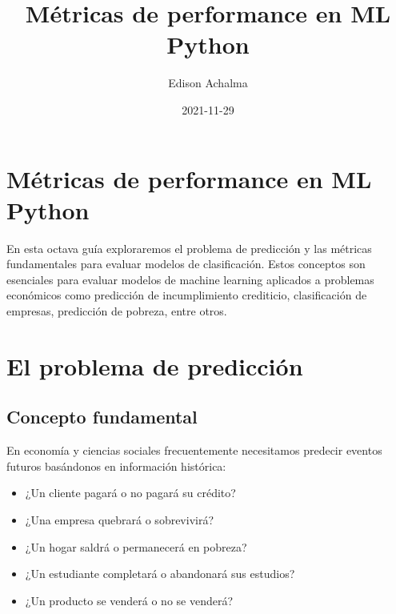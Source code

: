 \documentclass[
  doc,
  floatsintext,
  longtable,
  a4paper,
  nolmodern,
  notxfonts,
  notimes,
  12pt,
  colorlinks=true,linkcolor=blue,citecolor=blue,urlcolor=blue]{apa7}
\title{Métricas de performance en ML Python}
\author{Edison Achalma}
\affiliation{
{Escuela Profesional de Economía, Universidad Nacional de San Cristóbal
de Huamanga}}
\date{2021-11-29}
\providecommand{\tightlist}{%
  \setlength{\itemsep}{0pt}\setlength{\parskip}{0pt}}
\begin{document}
\maketitle


\hypertarget{toc}{}
\tableofcontents
\newpage
\section[Introduction]{Métricas de performance en ML Python}

\setcounter{secnumdepth}{3}

\setlength\LTleft{0pt}




En esta octava guía exploraremos el problema de predicción y las
métricas fundamentales para evaluar modelos de clasificación. Estos
conceptos son esenciales para evaluar modelos de machine learning
aplicados a problemas económicos como predicción de incumplimiento
crediticio, clasificación de empresas, predicción de pobreza, entre
otros.

\section{El problema de predicción}\label{el-problema-de-predicciuxf3n}

\subsection{Concepto fundamental}\label{concepto-fundamental}

En economía y ciencias sociales frecuentemente necesitamos predecir
eventos futuros basándonos en información histórica:

\begin{itemize}
\tightlist
\item
  ¿Un cliente pagará o no pagará su crédito?
\item
  ¿Una empresa quebrará o sobrevivirá?
\item
  ¿Un hogar saldrá o permanecerá en pobreza?
\item
  ¿Un estudiante completará o abandonará sus estudios?
\item
  ¿Un producto se venderá o no se venderá?
\end{itemize}
\end{document}
